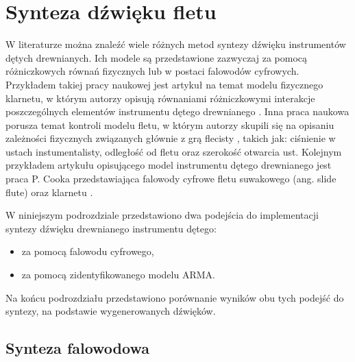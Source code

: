 \section{Synteza dźwięku fletu}

W literaturze można znaleźć wiele różnych metod syntezy dźwięku instrumentów dętych drewnianych. Ich modele są przedstawione zazwyczaj za pomocą różniczkowych równań fizycznych lub w postaci falowodów cyfrowych. 
Przykładem takiej pracy naukowej jest artykuł na temat modelu fizycznego klarnetu, w którym autorzy opisują równaniami różniczkowymi interakcje poszczególnych elementów instrumentu dętego drewnianego \cite{flute_klarnet}. Inna praca naukowa porusza temat kontroli modelu fletu, w którym autorzy skupili się na opisaniu zależności fizycznych związanych głównie z grą flecisty \cite{flute_flecista}, takich jak: ciśnienie w ustach instumentalisty, odległość od fletu oraz szerokość otwarcia ust. Kolejnym przykładem artykułu opisującego model instrumentu dętego drewnianego jest praca P. Cooka przedstawiająca falowody cyfrowe fletu suwakowego (ang. slide flute) oraz klarnetu \cite{flute_cook}.



W niniejszym podrozdziale przedstawiono dwa podejścia do implementacji syntezy dźwięku drewnianego instrumentu dętego:
\begin{itemize}
	\setlength\itemsep{-3pt}
	\item za pomocą falowodu cyfrowego,
	\item za pomocą zidentyfikowanego modelu ARMA.
\end{itemize}
Na końcu podrozdziału przedstawiono porównanie wyników obu tych podejść do syntezy, na podstawie wygenerowanych dźwięków.

\subsection{Synteza falowodowa}

